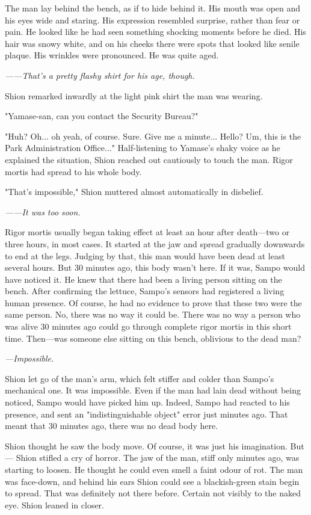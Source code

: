 The man lay behind the bench, as if to hide behind it. His mouth was
open and his eyes wide and staring. His expression resembled surprise,
rather than fear or pain. He looked like he had seen something shocking
moments before he died. His hair was snowy white, and on his cheeks
there were spots that looked like senile plaque. His wrinkles were
pronounced. He was quite aged.

\emph{------That's a pretty flashy shirt for his age, though.}

Shion remarked inwardly at the light pink shirt the man was wearing.

"Yamase-san, can you contact the Security Bureau?"

"Huh? Oh... oh yeah, of course. Sure. Give me a minute... Hello? Um,
this is the Park Administration Office..." Half-listening to Yamase's
shaky voice as he explained the situation, Shion reached out cautiously
to touch the man. Rigor mortis had spread to his whole body.

"That's impossible," Shion muttered almost automatically in disbelief.

\emph{------It was too soon.}

Rigor mortis usually began taking effect at least an hour after
death---two or three hours, in most cases. It started at the jaw and
spread gradually downwards to end at the legs. Judging by that, this man
would have been dead at least several hours. But 30 minutes ago, this
body wasn't here. If it was, Sampo would have noticed it. He knew that
there had been a living person sitting on the bench. After confirming
the lettuce, Sampo's sensors had registered a living human presence. Of
course, he had no evidence to prove that these two were the same person.
No, there was no way it could be. There was no way a person who was
alive 30 minutes ago could go through complete rigor mortis in this
short time. Then---was someone else sitting on this bench, oblivious to
the dead man?

\emph{---Impossible.}

Shion let go of the man's arm, which felt stiffer and colder than
Sampo's mechanical one. It was impossible. Even if the man had lain dead
without being noticed, Sampo would have picked him up. Indeed, Sampo had
reacted to his presence, and sent an "indistinguishable object" error
just minutes ago. That meant that 30 minutes ago, there was no dead body
here.

Shion thought he saw the body move. Of course, it was just his
imagination. But --- Shion stifled a cry of horror. The jaw of the man,
stiff only minutes ago, was starting to loosen. He thought he could even
smell a faint odour of rot. The man was face-down, and behind his ears
Shion could see a blackish-green stain begin to spread. That was
definitely not there before. Certain not visibly to the naked eye. Shion
leaned in closer.

